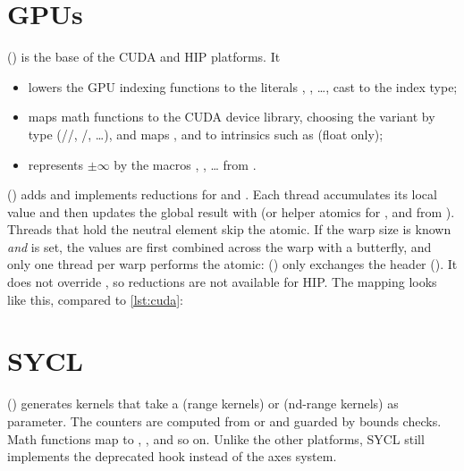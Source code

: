 \section{GPUs}\label{sec:gpu-platforms}

 () is the base of the CUDA and HIP platforms. It
\begin{itemize}
  \item lowers the GPU indexing functions to the literals ,
        , \dots, cast to the index type;
  \item maps math functions to the CUDA device library, choosing the variant by type
        (//, /, \dots), and maps
        ,  and  to intrinsics
        such as  (float only);
  \item represents $\pm\infty$ by the macros ,
        , \dots{} from .
\end{itemize}
 () adds  and
implements reductions for  and . Each thread accumulates its
local value and then updates the global result with  (or helper atomics
for ,  and  from ). Threads that
hold the neutral element skip the atomic. If the warp size is known \emph{and}
 is set, the values are first combined across
the warp with a  butterfly, and only one thread per warp performs
the atomic:
 () only exchanges the header
(). It does not override , so
reductions are not available for HIP. The  mapping looks like this,
compared to \cref{lst:cuda}:

\section{SYCL}
 () generates kernels that take a 
(range kernels) or  (nd-range kernels) as parameter. The counters
are computed from  or  and guarded by bounds
checks. Math functions map to , , and so on. Unlike the
other platforms, SYCL still implements the deprecated
 hook instead of the axes system.

